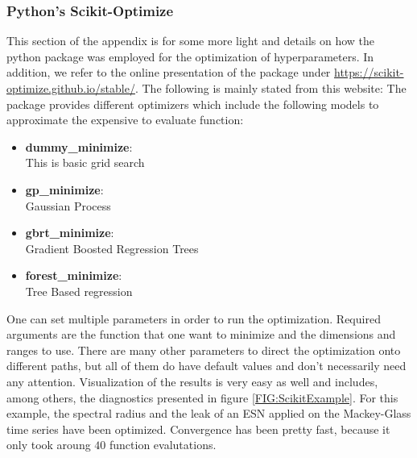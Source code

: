 \subsubsection{Python's Scikit-Optimize}
\label{A:ScikitOptimize}

This section of the appendix is for some more light and details on how the python package was employed for the optimization of hyperparameters. In addition, we refer to the online presentation of the package under \url{https://scikit-optimize.github.io/stable/}. The following is mainly stated from this website:
The package provides different optimizers which include the following models to approximate the expensive to evaluate function:
\begin{multicols}{2}
\begin{itemize}
\item {\bf dummy{\_}minimize}:\\ This is basic grid search
\item {\bf gp{\_}minimize}:\\ Gaussian Process
\item {\bf gbrt{\_}minimize}:\\ Gradient Boosted Regression Trees
\item {\bf forest{\_}minimize}:\\ Tree Based regression
\end{itemize}
\end{multicols}
One can set multiple parameters in order to run the optimization. Required arguments are the function that one want to minimize and the dimensions and ranges to use. There are many other parameters to direct the optimization onto different paths, but all of them do have default values and don't necessarily need any attention.
Visualization of the results is very easy as well and includes, among others, the diagnostics presented in figure \ref{FIG:ScikitExample}. For this example, the spectral radius and the leak of an ESN applied on the Mackey-Glass time series have been optimized. Convergence has been pretty fast, because it only took aroung $40$ function evalutations.
